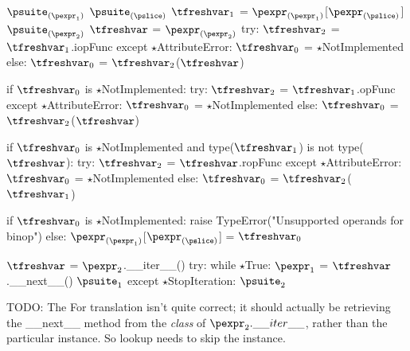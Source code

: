 \documentclass{article}
\begin{document}
\newsavebox{\augmentedSliceAssignmentBox}
\begin{lrbox}{\augmentedSliceAssignmentBox}
\begin{python}
$\psuite_{(\pexpr_1)}$
$\psuite_{(\pslice)}$
$\tfreshvar_1$ = $\pexpr_{(\pexpr_1)}$[$\pexpr_{(\pslice)}$]
$\psuite_{(\pexpr_2)}$
$\tfreshvar$ = $\pexpr_{(\pexpr_2)}$
try:
  $\tfreshvar_2$ = $\tfreshvar_1$.iopFunc
except $\star$AttributeError:
  $\tfreshvar_0$ = $\star$NotImplemented
else:
  $\tfreshvar_0$ = $\tfreshvar_2$($\tfreshvar$)

if $\tfreshvar_0$ is $\star$NotImplemented:
  try:
    $\tfreshvar_2$ = $\tfreshvar_1$.opFunc
  except $\star$AttributeError:
    $\tfreshvar_0$ = $\star$NotImplemented
  else:
    $\tfreshvar_0$ = $\tfreshvar_2$($\tfreshvar$)

if $\tfreshvar_0$ is $\star$NotImplemented and
  type($\tfreshvar_1$) is not type($\tfreshvar$):
  try:
    $\tfreshvar_2$ = $\tfreshvar$.ropFunc
  except $\star$AttributeError:
    $\tfreshvar_0$ = $\star$NotImplemented
  else:
    $\tfreshvar_0$ = $\tfreshvar_2$($\tfreshvar_1$)

if $\tfreshvar_0$ is $\star$NotImplemented:
  raise TypeError("Unsupported operands for binop")
else:
    $\pexpr_{(\pexpr_1)}$[$\pexpr_{(\pslice)}$] = $\tfreshvar_0$
\end{python}
\end{lrbox}

\begin{mathpar}
\end{mathpar}

\newsavebox{\forBox}
\begin{lrbox}{\forBox}
\begin{python}
$\tfreshvar$ = $\pexpr_2$.__iter__()
try:
  while $\star$True:
    $\pexpr_1$ = $\tfreshvar$.__next__()
    $\psuite_1$
except $\star$StopIteration:
  $\psuite_2$
\end{python}
\end{lrbox}

TODO: The For translation isn't quite correct; it should actually be retrieving
the \_\_next\_\_ method from the \emph{class} of $\pexpr_2.\_\_iter\_\_$, rather than
the particular instance. So lookup needs to skip the instance.
\end{document}
